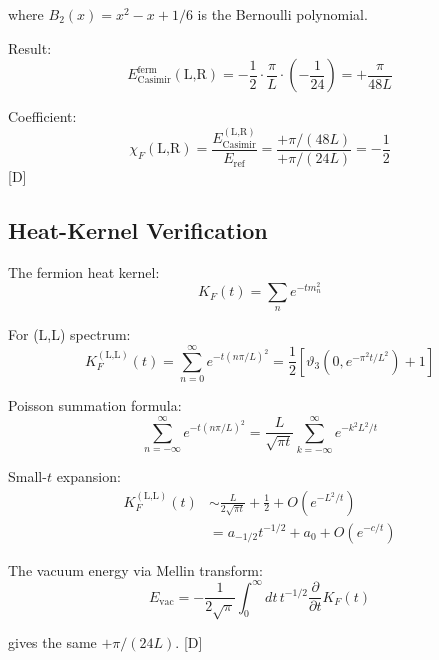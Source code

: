 \documentclass[11pt,a4paper]{article}
\newcommand{\tagD}{\textcolor{blue!70!black}{[D]}}
\begin{document}
where $B_2(x) = x^2 - x + 1/6$ is the Bernoulli polynomial.

Result:
\begin{equation}
\label{eq:app-casimir-LR}
E_{\text{Casimir}}^{\text{ferm}}(\text{L,R}) = -\frac{1}{2} \cdot \frac{\pi}{L} \cdot (-\frac{1}{24}) = +\frac{\pi}{48L}
\end{equation}

Coefficient:
\begin{equation}
\label{eq:app-chi-LR-val}
\chi_F(\text{L,R}) = \frac{E_{\text{Casimir}}^{(\text{L,R})}}{E_{\text{ref}}} = \frac{+\pi/(48L)}{+\pi/(24L)} = -\frac{1}{2}
\end{equation}
\tagD

\subsection{Heat-Kernel Verification}

The fermion heat kernel:
\begin{equation}
\label{eq:app-heat-ferm}
K_F(t) = \sum_n e^{-t m_n^2}
\end{equation}

For (L,L) spectrum:
\begin{equation}
\label{eq:app-heat-LL}
K_F^{(\text{L,L})}(t) = \sum_{n=0}^\infty e^{-t (n\pi/L)^2} = \frac{1}{2}\left[\vartheta_3(0, e^{-\pi^2 t/L^2}) + 1\right]
\end{equation}

Poisson summation formula:
\begin{equation}
\label{eq:app-poisson}
\sum_{n=-\infty}^\infty e^{-t(n\pi/L)^2} = \frac{L}{\sqrt{\pi t}} \sum_{k=-\infty}^\infty e^{-k^2 L^2/t}
\end{equation}

Small-$t$ expansion:
\begin{align}
\label{eq:app-heat-small-t}
K_F^{(\text{L,L})}(t) &\sim \frac{L}{2\sqrt{\pi t}} + \frac{1}{2} + O(e^{-L^2/t}) \\
\label{eq:app-heat-coeffs}
&= a_{-1/2} t^{-1/2} + a_0 + O(e^{-c/t})
\end{align}

The vacuum energy via Mellin transform:
\begin{equation}
\label{eq:app-mellin-ferm}
E_{\text{vac}} = -\frac{1}{2\sqrt{\pi}} \int_0^\infty dt\, t^{-1/2} \frac{\partial}{\partial t} K_F(t)
\end{equation}

gives the same $+\pi/(24L)$. \tagD
\end{document}
